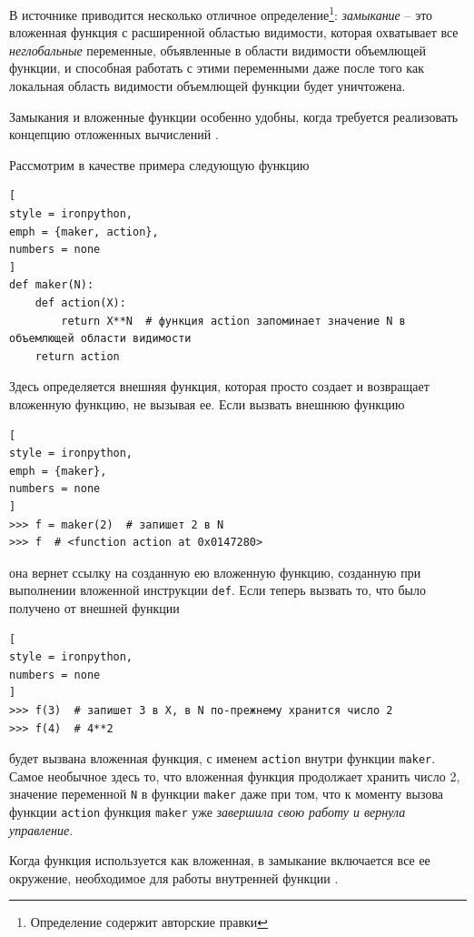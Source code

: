 \documentclass[%
	11pt,
	a4paper,
	utf8,
		]{article}
\begin{document}
В источнике \cite[]{ramalho:python-2016} приводится несколько отличное определение\footnote{Определение содержит авторские правки}: \emph{замыкание} -- это вложенная функция с расширенной областью видимости, которая охватывает все \emph{неглобальные} переменные, объявленные в области видимости объемлющей функции, и способная работать с этими переменными даже после того как локальная область видимости объемлющей функции будет уничтожена.

Замыкания и вложенные функции особенно удобны, когда требуется реализовать концепцию отложенных вычислений \cite{beazley:python-2010}.


Рассмотрим в качестве примера следующую функцию

\begin{lstlisting}[
style = ironpython,
emph = {maker, action},
numbers = none
]
def maker(N):
    def action(X):
        return X**N  # функция action запоминает значение N в объемлющей области видимости
    return action
\end{lstlisting}

Здесь определяется внешняя функция, которая просто создает и возвращает вложенную функцию, не вызывая ее. Если вызвать внешнюю функцию

\begin{lstlisting}[
style = ironpython,
emph = {maker},
numbers = none
]
>>> f = maker(2)  # запишет 2 в N
>>> f  # <function action at 0x0147280>
\end{lstlisting}
она вернет ссылку на созданную ею вложенную функцию, созданную при выполнении вложенной инструкции \texttt{def}. Если теперь вызвать то, что было получено от внешней функции

\begin{lstlisting}[
style = ironpython,
numbers = none
]
>>> f(3)  # запишет 3 в X, в N по-прежнему хранится число 2
>>> f(4)  # 4**2
\end{lstlisting}
будет вызвана вложенная функция, с именем \texttt{action} внутри функции \texttt{maker}. Самое необычное здесь то, что вложенная функция продолжает хранить число 2, значение переменной \texttt{N} в функции \texttt{maker} даже при том, что к моменту вызова функции \texttt{action} функция \texttt{maker} уже \emph{завершила свою работу и вернула управление}.

Когда функция используется как вложенная, в замыкание включается все ее окружение, необходимое для работы внутренней функции \cite[]{beazley:python-2010}.
\end{document}
